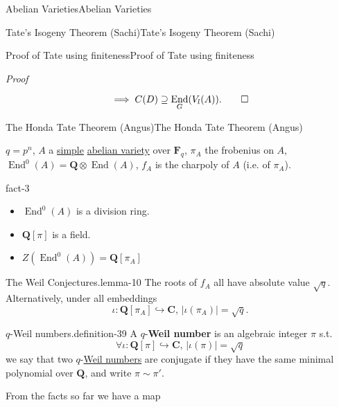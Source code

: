 \documentclass[10pt,]{book}
\makeatletter
\newcommand{\terminology}[1]{\textbf{#1}}
\renewcommand*{\proofname}{Proof}
\renewenvironment{proof}[1][\proofname]{\par
  \pushQED{\qed}%
  \normalfont \topsep6\p@\@plus6\p@\relax
  \trivlist
  \item\relax
    {\itshape
    #1\@addpunct{.}}\hspace\labelsep\ignorespaces
}{%
  \popQED\endtrivlist\@endpefalse
}
\numberwithin{equation}{section}
\newcommand{\lb}{[}
\newcommand{\rb}{]}
\newcommand{\QQ}{\mathbf{Q}}
\newcommand{\CC}{\mathbf{C}}
\newcommand{\FF}{\mathbf{F}}
\DeclareMathOperator{\End}{End}
\makeatother
\begin{document}
\begin{chapterptx}{Abelian Varieties}{}{Abelian Varieties}{}{}
\begin{sectionptx}{Tate's Isogeny Theorem (Sachi)}{}{Tate's Isogeny Theorem (Sachi)}{}{}
\begin{subsectionptx}{Proof of Tate using finiteness}{}{Proof of Tate using finiteness}{}{}
\begin{proof}
\begin{equation*}
\implies C(D) \supseteq \End_G(V_l(A))\text{.}\qedhere
\end{equation*}
%
\end{proof}
\end{subsectionptx}
\end{sectionptx}
%
%
\typeout{************************************************}
\typeout{************************************************}
%
\begin{sectionptx}{The Honda Tate Theorem (Angus)}{}{The Honda Tate Theorem (Angus)}{}{}\label{sec-honda-tate}
\begin{introduction}{}%
\hypertarget{p-402}{}%
\(q = p^n\), \(A\) a \hyperref[def-simple-av]{simple} \hyperref[def-buntes-abvar]{abelian variety} over \(\FF_q\), \(\pi_A\) the frobenius on \(A\), \(\End^0(A) = \QQ\otimes \End(A)\), \(f_A\) is the charpoly of \(A\) (i.e. of \(\pi_A\)).%
\begin{fact}{}{}{fact-3}%
\hypertarget{p-403}{}%
\leavevmode%
\begin{itemize}[label=\textbullet]
\item{}\(\End^0(A)\) is a division ring.%
\item{}\(\QQ\lb \pi\rb\) is a field.%
\item{}\(Z(\End^0(A)) = \QQ\lb \pi_A\rb\)%
\end{itemize}
%
\end{fact}
\begin{lemma}{The Weil Conjectures.}{}{lemma-10}%
\hypertarget{p-404}{}%
The roots of \(f_A\) all have absolute value \(\sqrt q\). Alternatively, under all embeddings%
\begin{equation*}
\iota \colon \QQ\lb \pi_A\rb \hookrightarrow \CC,\,|\iota(\pi_A)| = \sqrt q\text{.}
\end{equation*}
%
\end{lemma}
\begin{definition}{\(q\)-Weil numbers.}{definition-39}%
\hypertarget{p-405}{}%
A \(q\)-\terminology{Weil number} is an algebraic integer \(\pi\) s.t.%
\begin{equation*}
\forall \iota \colon \QQ\lb \pi\rb \hookrightarrow \CC,\,|\iota(\pi)| = \sqrt q
\end{equation*}
we say that two \(q\)-\hyperref[sec-honda-tate]{Weil numbers} are conjugate if they have the same minimal polynomial over \(\QQ\), and write \(\pi \sim \pi'\).%
\end{definition}
\hypertarget{p-406}{}%
From the facts so far we have a map%
\begin{equation*}

\end{equation*}
\end{introduction}
\end{sectionptx}
\end{chapterptx}
\end{document}
